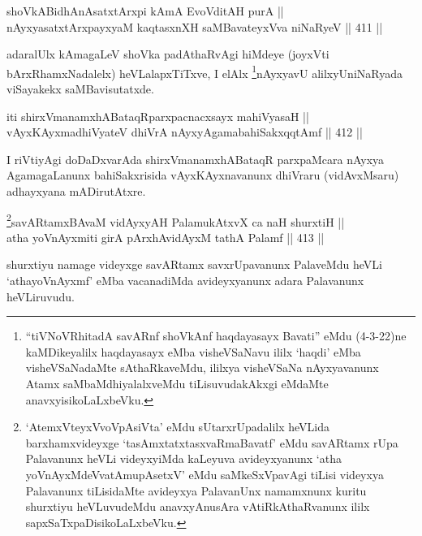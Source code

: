 \begin{shl}
shoVkABidhAnAsatxtArxpi kAmA EvoVditAH purA || \\
nAyxyasatxtArxpayxyaM kaqtasxnXH saMBavateyxVva niNaRyeV \hfill || 411 ||  
\end{shl}

\begin{artha}
adaralUlx kAmagaLeV shoVka padAthaRvAgi hiMdeye (joyxVti
bArxRhamxNadalelx) heVLalapxTiTxve, I elAlx \footnote{``tiVNoVRhitadA savARnf shoVkAnf haqdayasayx Bavati'' eMdu (4-3-22)ne kaMDikeyalilx haqdayasayx eMba visheVSaNavu ililx `haqdi' eMba visheVSaNadaMte sAthaRkaveMdu, ililxya visheVSaNa nAyxyavanunx Atamx saMbaMdhiyalalxveMdu tiLisuvudakAkxgi eMdaMte anavxyisikoLaLxbeVku.}nAyxyavU alilxyU\break niNaRyada viSayakekx saMBavisutatxde.
\end{artha}

\begin{shl}
iti shirxVmanamxhABataqRparxpacnacxsayx mahiVyasaH || \\
vAyxKAyxmadhiVyateV dhiVrA nAyxyAgamabahiSakxqqtAmf \hfill || 412 ||  
\end{shl}	

\begin{artha}
I riVtiyAgi doDaDxvarAda shirxVmanamxhABataqR parxpaMcara nAyxya
AgamagaLanunx bahiSakxrisida vAyxKAyxnavanunx dhiVraru (vidAvxMsaru)
adhayxyana mADirutAtxre.
\end{artha}




\begin{shl}
\footnote{`AtemxVteyxVvoVpAsiVta' eMdu sUtarxrUpadalilx heVLida barxhamxvideyxge `tasAmxtatxtasxvaRmaBavatf' eMdu savARtamx rUpa Palavanunx heVLi videyxyiMda kaLeyuva avideyxyanunx `atha yoV\s nAyxMdeVvatAmupAsetxV' eMdu saMkeSxVpavAgi tiLisi videyxya Palavanunx tiLisidaMte avideyxya PalavanUnx namamxnunx kuritu shurxtiyu heVLuvudeMdu anavxyAnusAra vAtiRkAthaRvanunx ililx sapxSaTxpaDisi\-koLaLxbeVku.}savARtamxBAvaM vidAyxyAH PalamukAtxvX ca naH shurxtiH || \\
atha yoV\s nAyxmiti girA pArxhAvidAyxM tathA Palamf \hfill || 413 ||  
\end{shl}

\begin{artha}
shurxtiyu namage videyxge savARtamx savxrUpavanunx PalaveMdu
heVLi `athayoV\s nAyxmf' eMba vacanadiMda avideyxyanunx adara Palavanunx
heVLiruvudu.
\end{artha}

